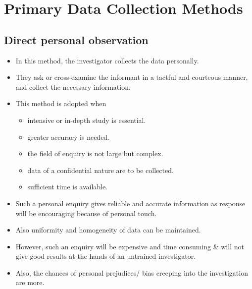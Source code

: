\documentclass[
10pt, %
a4paper, %
]{report}
\begin{document}
\section*{Primary Data Collection Methods}

\subsection*{Direct personal observation}
\begin{itemize}
\item In this method, the investigator collects the data personally.
\item They ask or cross-examine the informant in a tactful and courteous manner, and collect the necessary information.
\item This method is adopted when
\begin{itemize}
\item intensive or in-depth study is essential.
\item greater accuracy is needed.
\item the field of enquiry is not large but complex.
\item data of a confidential nature are to be collected.
\item sufficient time is available.
\end{itemize}
\item Such a personal enquiry gives reliable and accurate information as
response will be encouraging because of personal touch.
\item Also uniformity and homogeneity of data can be maintained.
\item However, such an enquiry will be expensive and time consuming \& will not give good results at the hands of an untrained investigator.
\item Also, the chances of personal prejudices/ bias creeping into the investigation are more.
\end{itemize}
\end{document}
